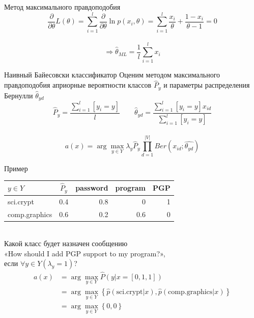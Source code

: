 \documentclass[10pt]{beamer}
\begin{document}
\begin{frame}{Метод максимального правдоподобия}
  $$\frac{\partial }{\partial \theta} L(\theta) = \sum\limits_{i=1}^{l} \frac{\partial }{\partial \theta} \ln p(x_i, \theta) = \sum\limits_{i=1}^{l} \frac{x_i}{\theta} + \frac{1-x_i}{\theta-1} = 0$$\\
  \pause
  $$\Rightarrow \hat{\theta}_{ML} = \frac{1}{l} \sum\limits_{i=1}^{l} x_i$$
\end{frame}

\begin{frame}{Наивный Байесовски классификатор}
  Оценим методом максимального правдоподобия априорные вероятности классов $\hat{P}_y$ и параметры распределения Бернулли 
  $\hat{\theta}_{yd}$\\
  $$\hat{P}_y = \frac{\sum\limits_{i=1}^l [y_i = y]}{l} \qquad \hat{\theta}_{yd} = \frac{\sum\limits_{i=1}^l [y_i = y] x_{id}}{\sum\limits_{i=1}^l [y_i = y]}$$\\
  \bigbreak
  \pause
  $$a(x) = \arg\max\limits_{y \in Y} \lambda_y \hat{P}_y \prod\limits_{d=1}^{|V|} Ber(x_{id}; \hat{\theta_{yd}})$$
\end{frame}

\begin{frame}{Пример}
  \centering
  \begin{tabular}{ l |c |r r r}
    $y \in Y$ & $\hat{P}_y$ & password & program & PGP \\
    \hline
    sci.crypt & 0.4 & 0.8 & 0 & 1 \\
    comp.graphics & 0.6 & 0.2 & 0.6 & 0\\
  \end{tabular}\\
  \bigbreak
  \pause
  Какой класс будет назначен сообщению \\«How should I add PGP support to my program?», \\если $\forall y \in Y (\lambda_y = 1)$? 
  \bigbreak
  \pause
  \begin{equation*}
    \begin{split}
    a(x) &= \arg\max\limits_{y \in Y} \hat{P}(y | x = [0, 1, 1]) \\
    & = \arg\max\limits_{y \in Y} \left\{\hat{p}(\text{sci.crypt}|x), \hat{p}(\text{comp.graphics}|x)\right\} \\
    & =  \arg\max\limits_{y \in Y} \left\{0, 0\right\}
    \end{split}
  \end{equation*}
\end{frame}
\end{document}
